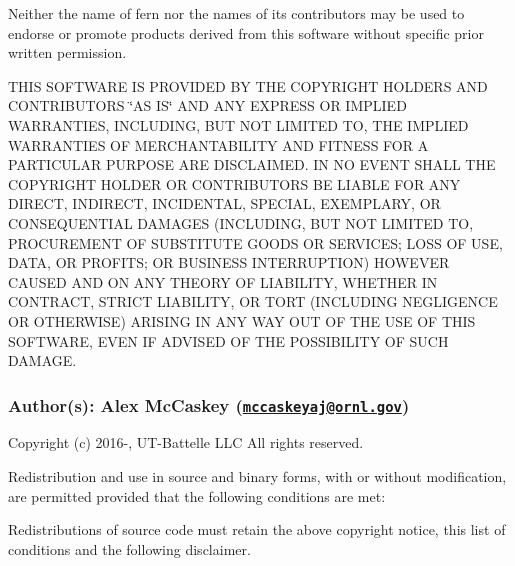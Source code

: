 Neither the name of fern nor the names of its contributors may be used to endorse or promote products derived from this software without specific prior written permission.

T\+H\+IS S\+O\+F\+T\+W\+A\+RE IS P\+R\+O\+V\+I\+D\+ED BY T\+HE C\+O\+P\+Y\+R\+I\+G\+HT H\+O\+L\+D\+E\+RS A\+ND C\+O\+N\+T\+R\+I\+B\+U\+T\+O\+RS \char`\"{}\+A\+S I\+S\char`\"{} A\+ND A\+NY E\+X\+P\+R\+E\+SS OR I\+M\+P\+L\+I\+ED W\+A\+R\+R\+A\+N\+T\+I\+ES, I\+N\+C\+L\+U\+D\+I\+NG, B\+UT N\+OT L\+I\+M\+I\+T\+ED TO, T\+HE I\+M\+P\+L\+I\+ED W\+A\+R\+R\+A\+N\+T\+I\+ES OF M\+E\+R\+C\+H\+A\+N\+T\+A\+B\+I\+L\+I\+TY A\+ND F\+I\+T\+N\+E\+SS F\+OR A P\+A\+R\+T\+I\+C\+U\+L\+AR P\+U\+R\+P\+O\+SE A\+RE D\+I\+S\+C\+L\+A\+I\+M\+ED. IN NO E\+V\+E\+NT S\+H\+A\+LL T\+HE C\+O\+P\+Y\+R\+I\+G\+HT H\+O\+L\+D\+ER OR C\+O\+N\+T\+R\+I\+B\+U\+T\+O\+RS BE L\+I\+A\+B\+LE F\+OR A\+NY D\+I\+R\+E\+CT, I\+N\+D\+I\+R\+E\+CT, I\+N\+C\+I\+D\+E\+N\+T\+AL, S\+P\+E\+C\+I\+AL, E\+X\+E\+M\+P\+L\+A\+RY, OR C\+O\+N\+S\+E\+Q\+U\+E\+N\+T\+I\+AL D\+A\+M\+A\+G\+ES (I\+N\+C\+L\+U\+D\+I\+NG, B\+UT N\+OT L\+I\+M\+I\+T\+ED TO, P\+R\+O\+C\+U\+R\+E\+M\+E\+NT OF S\+U\+B\+S\+T\+I\+T\+U\+TE G\+O\+O\+DS OR S\+E\+R\+V\+I\+C\+ES; L\+O\+SS OF U\+SE, D\+A\+TA, OR P\+R\+O\+F\+I\+TS; OR B\+U\+S\+I\+N\+E\+SS I\+N\+T\+E\+R\+R\+U\+P\+T\+I\+ON) H\+O\+W\+E\+V\+ER C\+A\+U\+S\+ED A\+ND ON A\+NY T\+H\+E\+O\+RY OF L\+I\+A\+B\+I\+L\+I\+TY, W\+H\+E\+T\+H\+ER IN C\+O\+N\+T\+R\+A\+CT, S\+T\+R\+I\+CT L\+I\+A\+B\+I\+L\+I\+TY, OR T\+O\+RT (I\+N\+C\+L\+U\+D\+I\+NG N\+E\+G\+L\+I\+G\+E\+N\+CE OR O\+T\+H\+E\+R\+W\+I\+SE) A\+R\+I\+S\+I\+NG IN A\+NY W\+AY O\+UT OF T\+HE U\+SE OF T\+H\+IS S\+O\+F\+T\+W\+A\+RE, E\+V\+EN IF A\+D\+V\+I\+S\+ED OF T\+HE P\+O\+S\+S\+I\+B\+I\+L\+I\+TY OF S\+U\+CH D\+A\+M\+A\+GE.

\subsubsection*{Author(s)\+: Alex Mc\+Caskey (\href{mailto:mccaskeyaj@ornl.gov}{\tt mccaskeyaj@ornl.\+gov}) }



 Copyright (c) 2016-\/, U\+T-\/\+Battelle L\+LC All rights reserved.

Redistribution and use in source and binary forms, with or without modification, are permitted provided that the following conditions are met\+:

Redistributions of source code must retain the above copyright notice, this list of conditions and the following disclaimer.

